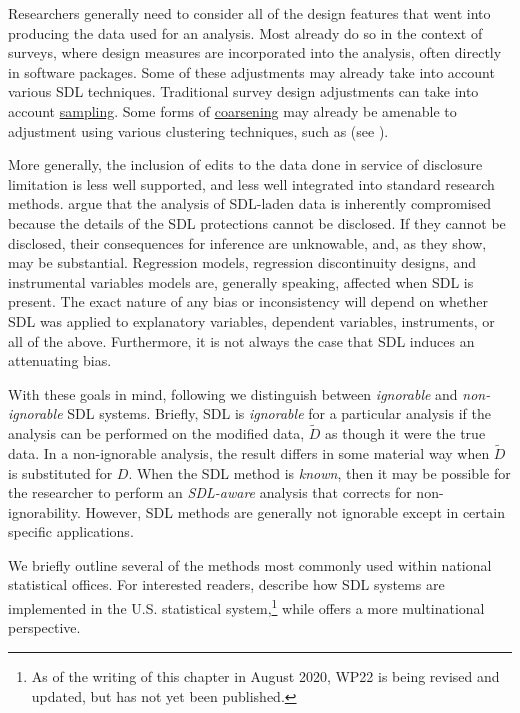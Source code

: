 \documentclass[
]{book}
\begin{document}
Researchers generally need to consider all of the design features that went into producing the data used for an analysis. Most already do so in the context of surveys, where design measures are incorporated into the analysis, often directly in software packages. Some of these adjustments may already take into account various SDL techniques. Traditional survey design adjustments can take into account \protect\hyperlink{sampling}{sampling}. Some forms of \protect\hyperlink{coarsening}{coarsening} may already be amenable to adjustment using various clustering techniques, such as \citet{moulton_random_1986} (see \citet{cameron_practitioners_2015}).

More generally, the inclusion of edits to the data done in service of disclosure limitation is less well supported, and less well integrated into standard research methods. \citet{abowd_economic_2015} argue that the analysis of SDL-laden data is inherently compromised because the details of the SDL protections cannot be disclosed. If they cannot be disclosed, their consequences for inference are unknowable, and, as they show, may be substantial. Regression models, regression discontinuity designs, and instrumental variables models are, generally speaking, affected when SDL is present. The exact nature of any bias or inconsistency will depend on whether SDL was applied to explanatory variables, dependent variables, instruments, or all of the above. Furthermore, it is not always the case that SDL induces an attenuating bias.

With these goals in mind, following \citet{abowd_economic_2015} we distinguish between \emph{ignorable} and \emph{non-ignorable} SDL systems.
Briefly, SDL is \emph{ignorable} for a particular analysis if the analysis can be performed on the modified data, \(\tilde{D}\) as though it were the true data. In a non-ignorable analysis, the result differs in some material way when \(\tilde{D}\) is substituted for \(D\). When the SDL method is \emph{known}, then it may be possible for the researcher to perform an \emph{SDL-aware} analysis that corrects for non-ignorability. However, SDL methods are generally not ignorable except in certain specific applications.

We briefly outline several of the methods most commonly used within national statistical offices. For interested readers, \citet{harris-kojetin_statistical_2005} describe how SDL systems are implemented in the U.S. statistical system,\footnote{As of the writing of this chapter in August 2020, WP22 is being revised and updated, but has not yet been published.} while \citet{dupriez_dissemination_2010} offers a more multinational perspective.
\end{document}
